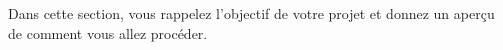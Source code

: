 \documentclass[../main.tex]{subfiles}
\begin{document}
Dans cette section, vous rappelez l'objectif de votre projet et donnez un aperçu de comment vous allez procéder.
\end{document}
